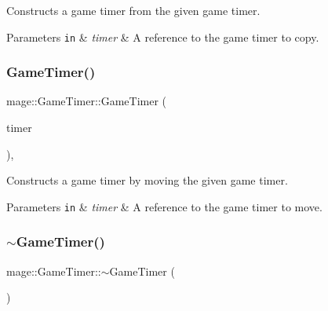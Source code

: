 Constructs a game timer from the given game timer.


\begin{DoxyParams}[1]{Parameters}
\mbox{\tt in}  & {\em timer} & A reference to the game timer to copy. \\
\hline
\end{DoxyParams}
\hypertarget{classmage_1_1_game_timer_a5be12a14c07e264f402635a87b78b401}{}\label{classmage_1_1_game_timer_a5be12a14c07e264f402635a87b78b401} 
\subsubsection{\texorpdfstring{Game\+Timer()}{GameTimer()}\hspace{0.1cm}{\footnotesize\ttfamily [3/3]}}
{\footnotesize\ttfamily mage\+::\+Game\+Timer\+::\+Game\+Timer (\begin{DoxyParamCaption}\item[{\hyperlink{classmage_1_1_game_timer}{Game\+Timer} \&\&}]{timer }\end{DoxyParamCaption})\hspace{0.3cm}{\ttfamily [default]}, {\ttfamily [noexcept]}}

Constructs a game timer by moving the given game timer.


\begin{DoxyParams}[1]{Parameters}
\mbox{\tt in}  & {\em timer} & A reference to the game timer to move. \\
\hline
\end{DoxyParams}
\hypertarget{classmage_1_1_game_timer_a1ba81ccdb247f932e7a396f1ce773bbd}{}\label{classmage_1_1_game_timer_a1ba81ccdb247f932e7a396f1ce773bbd} 
\subsubsection{\texorpdfstring{$\sim$\+Game\+Timer()}{~GameTimer()}}
{\footnotesize\ttfamily mage\+::\+Game\+Timer\+::$\sim$\+Game\+Timer (\begin{DoxyParamCaption}{ }\end{DoxyParamCaption})\hspace{0.3cm}{\ttfamily [default]}}


